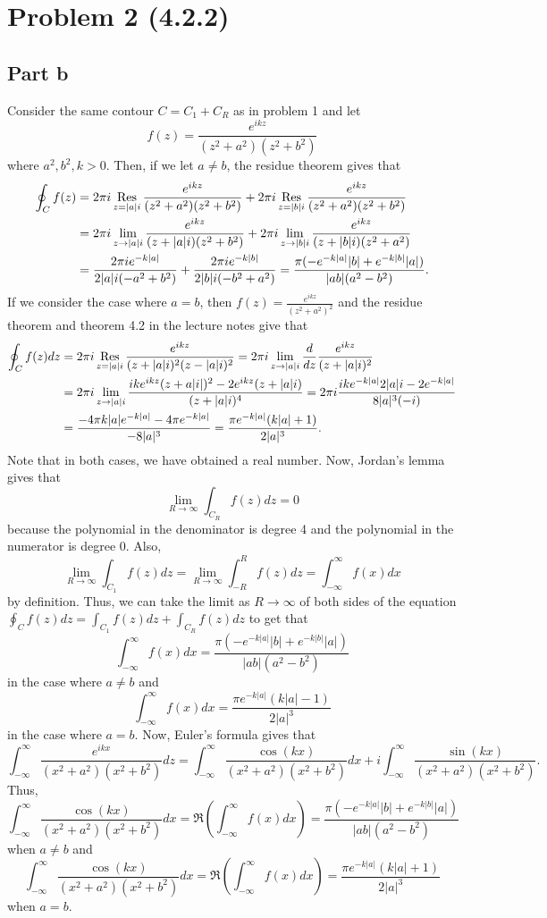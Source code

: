 \documentclass{article}
\begin{document}
\section{Problem 2 (4.2.2)} 
\subsection{Part b}
Consider the same contour $C=C_1+C_R$ as in problem 1 and let
\[
f(z)=\frac{e^{ikz}}{(z^2 + a^2)(z^2 + b^2)}
\]
where $a^2, b^2, k > 0$. Then, if we let $a\neq b$, the residue theorem gives that 
\begin{align*}
\oint_Cf(z)&=2\pi i\operatorname*{Res}_{z=|a|i}\frac{e^{ikz}}{(z^2 + a^2)(z^2 + b^2)}+2\pi i\operatorname*{Res}_{z=|b|i}\frac{e^{ikz}}{(z^2 + a^2)(z^2 + b^2)}\\&=
2\pi i\lim_{z\to|a|i}\frac{e^{ikz}}{(z + |a|i)(z^2 + b^2)}+2\pi i\lim_{z\to|b|i}\frac{e^{ikz}}{(z + |b|i)(z^2 + a^2)}\\&=
\frac{2\pi ie^{-k|a|}}{2|a|i(-a^2 + b^2)}+\frac{2\pi ie^{-k|b|}}{2|b|i(-b^2 + a^2)}=\frac{\pi(-e^{-k|a|}|b|+e^{-k|b|}|a|)}{|ab|(a^2-b^2)}.
\end{align*}
If we consider the case where $a=b$, then $f(z)=\frac{e^{ikz}}{(z^2 + a^2)^2}$ and the residue theorem and theorem 4.2 in the lecture notes give that 
\begin{align*}
\oint_Cf(z)dz&=2\pi i\operatorname*{Res}_{z=|a|i}\frac{e^{ikz}}{(z+|a|i)^2(z-|a|i)^2}=2\pi i\lim_{z\to|a|i}\frac{d}{dz}\frac{e^{ikz}}{(z+|a|i)^2}\\&=2\pi i\lim_{z\to|a|i}\frac{ike^{ikz}(z+a|i|)^2-2e^{ikz}(z+|a|i)}{(z+|a|i)^4}=2\pi i\frac{ike^{-k|a|}2|a|i-2e^{-k|a|}}{8|a|^3(-i)}\\&=
\frac{-4\pi k|a|e^{-k|a|}-4\pi e^{-k|a|}}{-8|a|^3}=\frac{\pi e^{-k|a|}(k|a|+1)}{2|a|^3}.
\end{align*}
Note that in both cases, we have obtained a real number. Now, Jordan's lemma gives that 
\[
\lim_{R\to\infty}\int_{C_R}f(z)dz=0
\]
because the polynomial in the denominator is degree 4 and the polynomial in the numerator is degree 0. Also,
\[
\lim_{R\to\infty}\int_{C_1}f(z)dz=\lim_{R\to\infty}\int_{-R}^Rf(z)dz=\int_{-\infty}^\infty f(x)dx
\]
by definition. Thus, we can take the limit as $R\to\infty$ of both sides of the equation $\oint_{C}f(z)dz=\int_{C_1}f(z)dz+\int_{C_R}f(z)dz$ to get that 
\[
\int_{-\infty}^\infty f(x)dx = \frac{\pi(-e^{-k|a|}|b|+e^{-k|b|}|a|)}{|ab|(a^2-b^2)}
\]
in the case where $a\neq b$ and 
\[
\int_{-\infty}^\infty f(x)dx = \frac{\pi e^{-k|a|}(k|a|-1)}{2|a|^3}
\]
in the case where $a=b$. Now, Euler's formula gives that 
\[
\int_{-\infty}^\infty\frac{e^{ikx}}{(x^2 + a^2)(x^2 + b^2)}dz=\int_{-\infty}^\infty \frac{\cos(kx)}{(x^2 + a^2)(x^2 + b^2)}dx+i\int_{-\infty}^\infty \frac{\sin(kx)}{(x^2 + a^2)(x^2 + b^2)}.
\]
Thus, 
\[
\int_{-\infty}^\infty \frac{\cos(kx)}{(x^2 + a^2)(x^2 + b^2)}dx = \Re\left(\int_{-\infty}^\infty f(x)dx\right)=\frac{\pi(-e^{-k|a|}|b|+e^{-k|b|}|a|)}{|ab|(a^2-b^2)}
\]
when $a\neq b$ and 
\[
\int_{-\infty}^\infty \frac{\cos(kx)}{(x^2 + a^2)(x^2 + b^2)}dx = \Re\left(\int_{-\infty}^\infty f(x)dx\right)=\frac{\pi e^{-k|a|}(k|a|+1)}{2|a|^3}
\]
when $a=b$.
\end{document}
